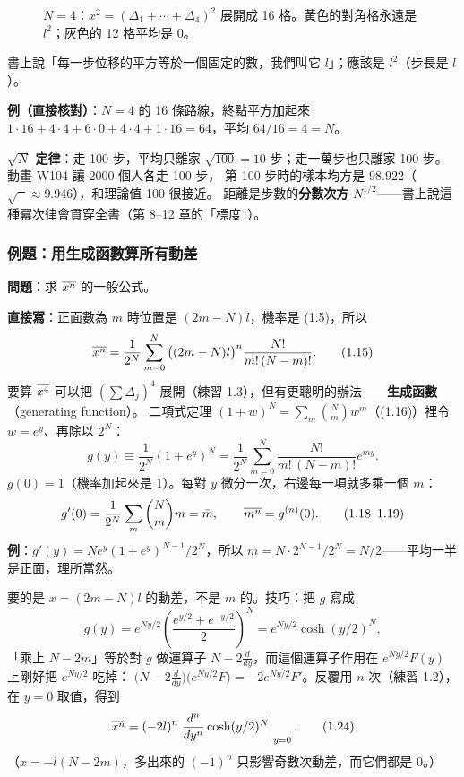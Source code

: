 \begin{figure}[H]
\centering
\FigDeltaGrid
\caption{$N=4$：$x^2=(\Delta_1+\cdots+\Delta_4)^2$ 展開成 16 格。黃色的對角格永遠是 $l^2$；灰色的 12 格平均是 0。}
\label{fig:deltagrid}
\end{figure}

\begin{errbox}[p.~6，(1.13) 前]
書上說「每一步位移的平方等於一個固定的數，我們叫它 $l$」；應該是 $l^2$（步長是 $l$）。
\end{errbox}

\textbf{例（直接核對）}：$N=4$ 的 16 條路線，終點平方加起來 $1\cdot16+4\cdot4+6\cdot0+4\cdot4+1\cdot16=64$，平均 $64/16=4=N$。\par
\textbf{$\sqrt N$ 定律}：走 100 步，平均只離家 $\sqrt{100}=10$ 步；走一萬步也只離家 100 步。動畫 W104 讓 2000 個人各走 100 步，
第 100 步時的樣本均方是 $98.922$（$\sqrt{\phantom{x}}\approx9.946$），和理論值 100 很接近。
距離是步數的\textbf{分數次方} $N^{1/2}$——書上說這種冪次律會貫穿全書（第 8--12 章的「標度」）。

\subsubsection*{例題：用生成函數算所有動差 }
\textbf{問題}：求 $\overline{x^n}$ 的一般公式。

\textbf{直接寫}：正面數為 $m$ 時位置是 $(2m-N)l$，機率是 (1.5)，所以
\begin{equation}
\overline{x^n}=\frac1{2^N}\sum_{m=0}^N\big((2m-N)l\big)^n\frac{N!}{m!\,(N-m)!}. \tag{1.15}
\end{equation}
要算 $\overline{x^4}$ 可以把 $(\sum\Delta_j)^4$ 展開（練習 1.3），但有更聰明的辦法——\textbf{生成函數}（generating function）。
二項式定理 $(1+w)^N=\sum_m\binom Nm w^m$（(1.16)）裡令 $w=e^y$、再除以 $2^N$：
\begin{equation}
g(y)\equiv\frac1{2^N}\left(1+e^y\right)^N=\frac1{2^N}\sum_{m=0}^N\frac{N!}{m!\,(N-m)!}e^{my}. \tag{1.17}
\end{equation}
$g(0)=1$（機率加起來是 1）。每對 $y$ 微分一次，右邊每一項就多乘一個 $m$：
\begin{equation}
g'(0)=\frac1{2^N}\sum_m\binom Nm m=\bar m,\qquad \overline{m^n}=g^{(n)}(0). \tag{1.18--1.19}
\end{equation}
\textbf{例}：$g'(y)=Ne^y(1+e^y)^{N-1}/2^N$，所以 $\bar m=N\cdot2^{N-1}/2^N=N/2$——平均一半是正面，理所當然。

要的是 $x=(2m-N)l$ 的動差，不是 $m$ 的。技巧：把 $g$ 寫成
\begin{equation}
g(y)=e^{Ny/2}\left(\frac{e^{y/2}+e^{-y/2}}{2}\right)^N=e^{Ny/2}\cosh(y/2)^N, \tag{1.21}
\end{equation}
「乘上 $N-2m$」等於對 $g$ 做運算子 $N-2\frac d{dy}$，而這個運算子作用在 $e^{Ny/2}F(y)$ 上剛好把 $e^{Ny/2}$ 吃掉：
$\big(N-2\frac d{dy}\big)\big(e^{Ny/2}F\big)=-2e^{Ny/2}F'$。反覆用 $n$ 次（練習 1.2），在 $y=0$ 取值，得到
\begin{equation}
\overline{x^n}=(-2l)^n\left.\frac{d^n}{dy^n}\cosh(y/2)^N\right|_{y=0}. \tag{1.24}
\end{equation}
（$x=-l(N-2m)$，多出來的 $(-1)^n$ 只影響奇數次動差，而它們都是 0。）

